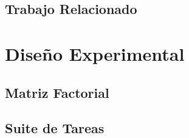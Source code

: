 \documentclass[runningheads]{llncs}
\begin{document}
\subsection{Trabajo Relacionado}
\label{sec:related}

%
\section{Dise\~no Experimental}
\label{sec:design}

\subsection{Matriz Factorial}
\label{sec:matrix}


\subsection{Suite de Tareas}
\label{sec:tasks}
\end{document}
